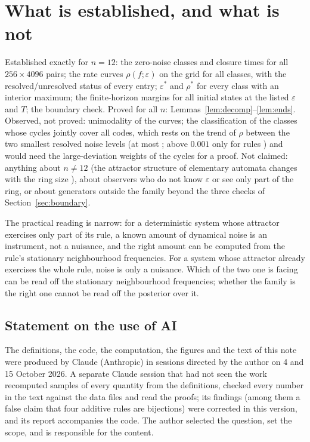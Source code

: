 \documentclass[11pt,a4paper]{article}
\theoremstyle{remark}
\newcommand{\eps}{\varepsilon}
\begin{document}
\section{What is established, and what is not}

Established exactly for $n=12$: the zero-noise classes and closure times for all $256\times4096$ pairs; the rate curves $\rho(f;\eps)$ on the grid for all classes, with the resolved/unresolved status of every entry; $\eps^*$ and $\rho^*$ for every class with an interior maximum; the finite-horizon margins for all initial states at the listed $\eps$ and $T$; the boundary check. Proved for all $n$: Lemmas~\ref{lem:decomp}--\ref{lem:ends}. Observed, not proved: unimodality of the curves; the classification of the \NumClassesUndet{} classes whose cycles jointly cover all codes, which rests on the trend of $\rho$ between the two smallest resolved noise levels (at most \TrendSecondEpsMax; above $0.001$ only for rules \TrendLateRules) and would need the large-deviation weights of the cycles for a proof. Not claimed: anything about $n\ne12$ (the attractor structure of elementary automata changes with the ring size \citep{WuenscheLesser1992}), about observers who do not know $\eps$ or see only part of the ring, or about generators outside the family beyond the three checks of Section~\ref{sec:boundary}.

The practical reading is narrow: for a deterministic system whose attractor exercises only part of its rule, a known amount of dynamical noise is an instrument, not a nuisance, and the right amount can be computed from the rule's stationary neighbourhood frequencies. For a system whose attractor already exercises the whole rule, noise is only a nuisance. Which of the two one is facing can be read off the stationary neighbourhood frequencies; whether the family is the right one cannot be read off the posterior over it.

\subsection*{Statement on the use of AI}
The definitions, the code, the computation, the figures and the text of this note were produced by Claude (Anthropic) in sessions directed by the author on 4 and 15 October 2026. A separate Claude session that had not seen the work recomputed samples of every quantity from the definitions, checked every number in the text against the data files and read the proofs; its findings (among them a false claim that four additive rules are bijections) were corrected in this version, and its report accompanies the code. The author selected the question, set the scope, and is responsible for the content.
\end{document}
